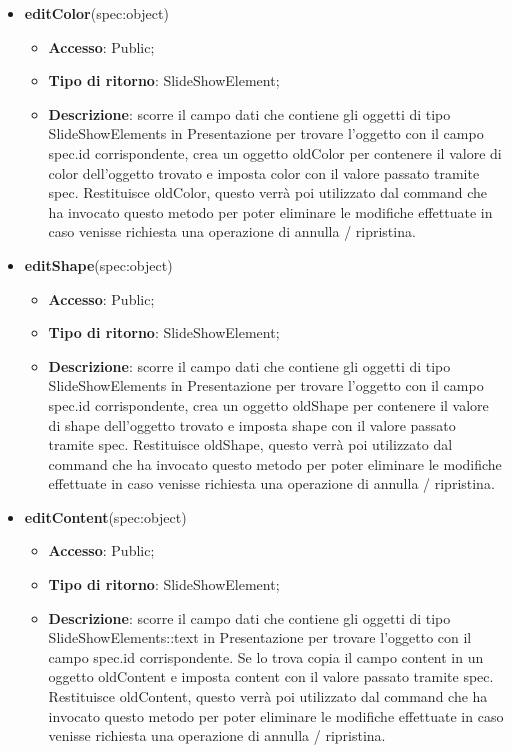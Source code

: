 {\begin{itemize}
			\item \textbf{editColor}(spec:object)
			\begin{itemize}
				\item \textbf{Accesso}: Public;
				\item \textbf{Tipo di ritorno}: SlideShowElement;
				\item \textbf{Descrizione}: scorre il campo dati che contiene gli oggetti di tipo SlideShowElements in Presentazione per trovare l’oggetto con il campo spec.id corrispondente, crea un oggetto oldColor per contenere il valore di color dell’oggetto trovato e imposta color con il valore passato tramite spec. Restituisce oldColor, questo verrà poi utilizzato dal command che ha invocato questo metodo per poter eliminare le modifiche effettuate in caso venisse richiesta una operazione di annulla / ripristina.
			\end{itemize}
			\item \textbf{editShape}(spec:object)
			\begin{itemize}
				\item \textbf{Accesso}: Public;
				\item \textbf{Tipo di ritorno}: SlideShowElement;
				\item \textbf{Descrizione}: scorre il campo dati che contiene gli oggetti di tipo SlideShowElements in Presentazione per trovare l’oggetto con il campo spec.id corrispondente, crea un oggetto oldShape per contenere il valore di shape dell’oggetto trovato e imposta shape con il valore passato tramite spec. Restituisce oldShape, questo verrà poi utilizzato dal command che ha invocato questo metodo per poter eliminare le modifiche effettuate in caso venisse richiesta una operazione di annulla / ripristina.
			\end{itemize}
			\item \textbf{editContent}(spec:object)
			\begin{itemize}
				\item \textbf{Accesso}: Public;
				\item \textbf{Tipo di ritorno}: SlideShowElement;
				\item \textbf{Descrizione}: scorre il campo dati che contiene gli oggetti di tipo SlideShowElements::text in Presentazione per trovare l’oggetto con il campo spec.id corrispondente. Se lo trova copia il campo content in un oggetto oldContent e imposta content con il valore passato tramite spec. Restituisce oldContent, questo verrà poi utilizzato dal command che ha invocato questo metodo per poter eliminare le modifiche effettuate in caso venisse richiesta una operazione di annulla / ripristina.

\end{itemize}
\end{itemize}}
